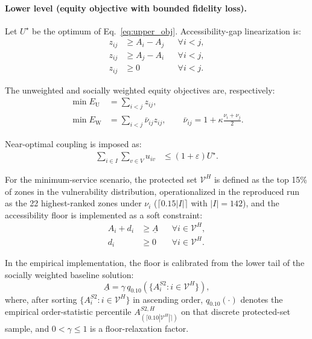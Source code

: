 \documentclass[final,5p,times,twocolumn,authoryear]{elsarticle}
\begin{document}
\paragraph{Lower level (equity objective with bounded fidelity loss).}
Let $U^{\star}$ be the optimum of Eq.~\eqref{eq:upper_obj}. Accessibility-gap linearization is:
\begin{align}
z_{ij} &\ge A_i-A_j && \forall i<j, \label{eq:gap1} \\
z_{ij} &\ge A_j-A_i && \forall i<j, \label{eq:gap2} \\
z_{ij} &\ge 0 && \forall i<j. \label{eq:gap3}
\end{align}

The unweighted and socially weighted equity objectives are, respectively:
\begin{align}
\min E_{\mathrm{U}} &= \sum_{i<j}z_{ij}, \label{eq:lower_unweighted} \\
\min E_{\mathrm{W}} &= \sum_{i<j}\bar{\nu}_{ij}z_{ij}, \qquad
\bar{\nu}_{ij}=1+\kappa\frac{\nu_i+\nu_j}{2}. \label{eq:lower_weighted}
\end{align}

Near-optimal coupling is imposed as:
\begin{align}
\sum_{i\in I}\sum_{v\in V}u_{iv} &\le (1+\varepsilon)U^{\star}. \label{eq:near_opt}
\end{align}

For the minimum-service scenario, the protected set $\mathcal{V}^{H}$ is defined as the top
15\% of zones in the vulnerability distribution, operationalized in the reproduced run as the
22 highest-ranked zones under $\nu_i$ ($\lceil 0.15|I|\rceil$ with $|I|=142$), and the
accessibility floor is implemented as a soft constraint:
\begin{align}
A_i + d_i &\ge \underline{A} && \forall i\in \mathcal{V}^{H}, \label{eq:soft_floor} \\
d_i &\ge 0 && \forall i\in \mathcal{V}^{H}. \label{eq:soft_floor_nonneg}
\end{align}

In the empirical implementation, the floor is calibrated from the lower tail of the socially
weighted baseline solution:
\begin{equation}
\underline{A}=\gamma\,q_{0.10}\!\left(\{A_i^{S2}: i\in \mathcal{V}^{H}\}\right),
\label{eq:floor_calibration}
\end{equation}
where, after sorting $\{A_i^{S2}: i\in \mathcal{V}^{H}\}$ in ascending order,
$q_{0.10}(\cdot)$ denotes the empirical order-statistic percentile
$A_{(\lceil 0.10|\mathcal{V}^{H}|\rceil)}^{S2,H}$ on that discrete protected-set sample, and
$0<\gamma\le 1$ is a floor-relaxation factor.
\end{document}
